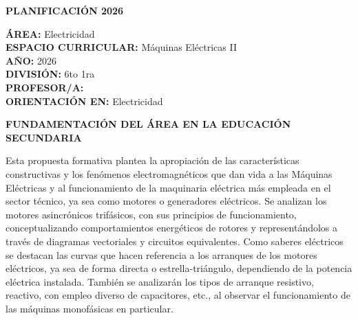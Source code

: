 \documentclass[a4paper,12pt]{article}
\begin{document}
\newpage

\begin{center}
  \fontsize{14pt}{16pt}\selectfont \textbf{\uppercase{Planificación 2026}}
\end{center}

\vspace{0.3cm}

\raggedright
\textbf{ÁREA:} Electricidad \\
\textbf{ESPACIO CURRICULAR:} Máquinas Eléctricas II \\
\textbf{AÑO:} 2026 \\
\textbf{DIVISIÓN:} 6to 1ra \\
\textbf{PROFESOR/A:} \profesor \\
\textbf{ORIENTACIÓN EN:} Electricidad

\vspace{0.5cm}

\begin{center}
  \fontsize{12pt}{14pt}\selectfont \textbf{\uppercase{FUNDAMENTACIÓN DEL ÁREA EN LA EDUCACIÓN SECUNDARIA}}
\end{center}
\fontsize{12pt}{14pt}\selectfont
Esta propuesta formativa plantea la apropiación de las
características constructivas y los fenómenos electromagnéticos que
dan vida a las Máquinas Eléctricas y al funcionamiento de la
maquinaria eléctrica más empleada en el sector técnico, ya sea como
motores o generadores eléctricos. Se analizan los motores
asincrónicos trifásicos, con sus principios de funcionamiento,
conceptualizando comportamientos energéticos de rotores y
representándolos a través de diagramas vectoriales y circuitos
equivalentes. Como saberes eléctricos se destacan las curvas que
hacen referencia a los arranques de los motores eléctricos, ya sea de
forma directa o estrella-triángulo, dependiendo de la potencia
eléctrica instalada. También se analizarán los tipos de arranque
resistivo, reactivo, con empleo diverso de capacitores, etc., al
observar el funcionamiento de las máquinas monofásicas en particular.

\vspace{0.5cm}
\end{document}
